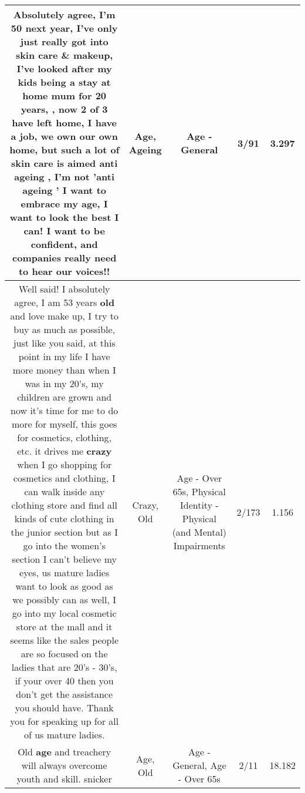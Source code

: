 \documentclass[11pt]{article}
\newlength\mylength
\begin{document}
\begin{center}
\begin{longtable}{|C{.65\mylength}|C{.30\mylength}|C{.12\mylength}|C{.12\mylength}|C{.12\mylength}|}
  \small Absolutely agree, I'm 50 next year, I've only just really got into skin care \& makeup, I've looked after my kids being a stay at home mum for 20 years, , now 2 of 3 have left home, I have a job, we own our own home, but such a lot of skin care is aimed anti \textbf{ageing} , I'm not 'anti \textbf{ageing} '  I want to embrace my \textbf{age}, I want to look the best I can! I want to be confident, and companies really need to hear our voices!!\normalsize   & Age, Ageing & Age - General & 3/91 & 3.297 \\  \hline
  \small Well said! I absolutely agree, I am 53 years \textbf{old} and love make up, I try to buy as much as possible, just like you said, at this point in my life I have more money than when I was in my 20's, my children are grown and now it's time for me to do more for myself, this goes for cosmetics, clothing, etc. it drives me \textbf{crazy} when I go shopping for cosmetics and clothing, I can walk inside any clothing store and find all kinds of cute clothing in the junior section but as I go into the women's section I can't believe my eyes, us mature ladies want to look as good as we possibly can as well, I go into my local cosmetic store at the mall and it seems like the sales people are so focused on the ladies that are 20's - 30's, if your over 40 then you don't get the assistance you should have. Thank you for speaking up for all of us mature ladies.\normalsize   & Crazy, Old & Age - Over 65s, Physical Identity - Physical (and Mental) Impairments & 2/173 & 1.156 \\  \hline
  \small Old \textbf{age} and treachery will always overcome youth and skill.  snicker\normalsize   & Age, Old & Age - General, Age - Over 65s & 2/11 & 18.182 \\  \hline

\end{longtable}
\end{center}
\end{document}
